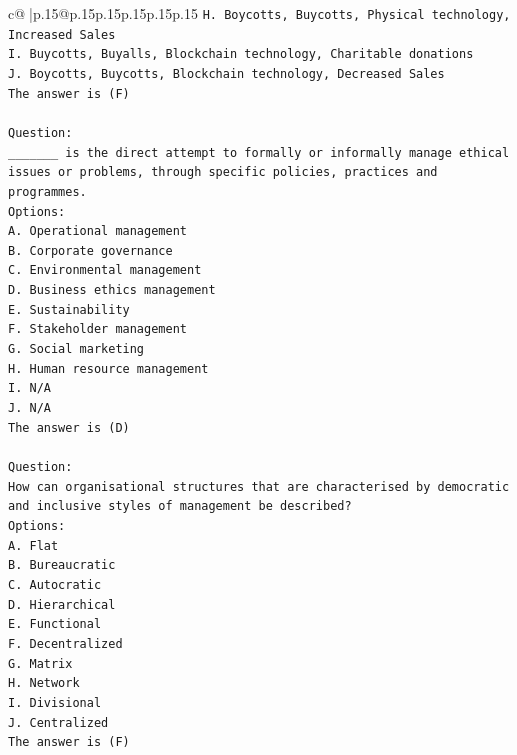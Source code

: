 \documentclass{article}
\begin{document}
{\begin{supertabular}{c@{$\;$}|p{.15\linewidth}@{}p{.15\linewidth}p{.15\linewidth}p{.15\linewidth}p{.15\linewidth}p{.15\linewidth}}
{{{\texttt{H. Boycotts, Buycotts, Physical technology, Increased Sales} \\
\texttt{I. Buycotts, Buyalls, Blockchain technology, Charitable donations} \\
\texttt{J. Boycotts, Buycotts, Blockchain technology, Decreased Sales} \\
\texttt{The answer is (F)} \\
\\ 
\texttt{Question:} \\
\texttt{\_\_\_\_\_\_\_ is the direct attempt to formally or informally manage ethical issues or problems, through specific policies, practices and programmes.} \\
\texttt{Options:} \\
\texttt{A. Operational management} \\
\texttt{B. Corporate governance} \\
\texttt{C. Environmental management} \\
\texttt{D. Business ethics management} \\
\texttt{E. Sustainability} \\
\texttt{F. Stakeholder management} \\
\texttt{G. Social marketing} \\
\texttt{H. Human resource management} \\
\texttt{I. N/A} \\
\texttt{J. N/A} \\
\texttt{The answer is (D)} \\
\\ 
\texttt{Question:} \\
\texttt{How can organisational structures that are characterised by democratic and inclusive styles of management be described?} \\
\texttt{Options:} \\
\texttt{A. Flat} \\
\texttt{B. Bureaucratic} \\
\texttt{C. Autocratic} \\
\texttt{D. Hierarchical} \\
\texttt{E. Functional} \\
\texttt{F. Decentralized} \\
\texttt{G. Matrix} \\
\texttt{H. Network} \\
\texttt{I. Divisional} \\
\texttt{J. Centralized} \\
\texttt{The answer is (F)} \\
}}}
\end{supertabular}}
\end{document}
